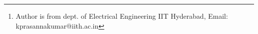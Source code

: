 \documentclass[journal,12pt,twocolumn]{IEEEtran}
\begin{document}

 
 

\title{} 
 
%
%
%


\author{K Prasanna Kumar %
\thanks{Author is from dept. of Electrical Engineering IIT Hyderabad, Email: kprasannakumar@iith.ac.in}}


\maketitle


\tableofcontents

\bigskip

\begin{abstract}
This module explains about the comparative study of M-array Phase Shift keying and M-array Amplitude Phase Shift Keying.
\end{abstract}
\end{document}
